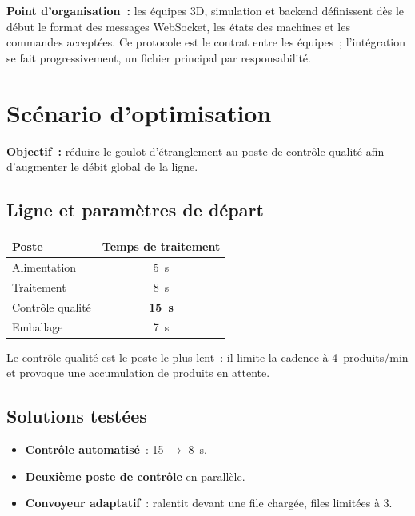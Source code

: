 \documentclass[11pt,a4paper,openany]{report}
\begin{document}
\begin{callout}
\textbf{Point d'organisation~:} les équipes 3D, simulation et backend définissent dès le début le format des messages WebSocket, les états des machines et les commandes acceptées. Ce protocole est le contrat entre les équipes~; l'intégration se fait progressivement, un fichier principal par responsabilité.
\end{callout}

\clearpage
\section{Scénario d'optimisation}
\textbf{Objectif~:} réduire le goulot d'étranglement au poste de contrôle qualité afin d'augmenter le débit global de la ligne.

\subsection*{Ligne et paramètres de départ}
\begin{table}[H]
\centering
\begin{tabular}{@{}lc@{}}
\toprule
\textbf{Poste} & \textbf{Temps de traitement} \\
\midrule
Alimentation & 5~s \\
Traitement & 8~s \\
Contrôle qualité & \textbf{15~s} \\
Emballage & 7~s \\
\bottomrule
\end{tabular}
\end{table}
Le contrôle qualité est le poste le plus lent~: il limite la cadence à 4~produits/min et provoque une accumulation de produits en attente.

\subsection*{Solutions testées}
\begin{itemize}[nosep]
  \item \textbf{Contrôle automatisé}~: 15 $\rightarrow$ 8~s.
  \item \textbf{Deuxième poste de contrôle} en parallèle.
  \item \textbf{Convoyeur adaptatif}~: ralentit devant une file chargée, files limitées à 3.
\end{itemize}
\end{document}
